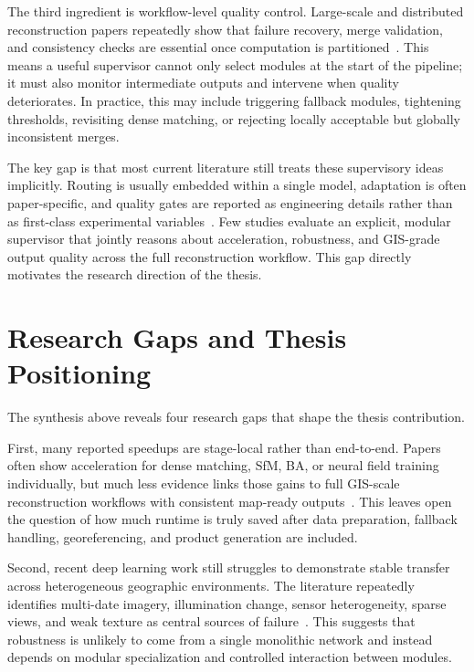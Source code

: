 The third ingredient is workflow-level quality control. Large-scale and distributed reconstruction papers repeatedly show that failure recovery, merge validation, and consistency checks are essential once computation is partitioned~\cite{Zheng2023,Li2025BALM,Zhou2026,Elias2025}. This means a useful supervisor cannot only select modules at the start of the pipeline; it must also monitor intermediate outputs and intervene when quality deteriorates. In practice, this may include triggering fallback modules, tightening thresholds, revisiting dense matching, or rejecting locally acceptable but globally inconsistent merges.

The key gap is that most current literature still treats these supervisory ideas implicitly. Routing is usually embedded within a single model, adaptation is often paper-specific, and quality gates are reported as engineering details rather than as first-class experimental variables~\cite{SMoEStereo2025,SatDN2025,Elias2025}. Few studies evaluate an explicit, modular supervisor that jointly reasons about acceleration, robustness, and GIS-grade output quality across the full reconstruction workflow. This gap directly motivates the research direction of the thesis.

\section{Research Gaps and Thesis Positioning}

The synthesis above reveals four research gaps that shape the thesis contribution.

First, many reported speedups are stage-local rather than end-to-end. Papers often show acceleration for dense matching, SfM, BA, or neural field training individually, but much less evidence links those gains to full GIS-scale reconstruction workflows with consistent map-ready outputs~\cite{Li2025FastMap,SatDN2025,Elias2025}. This leaves open the question of how much runtime is truly saved after data preparation, fallback handling, georeferencing, and product generation are included.

Second, recent deep learning work still struggles to demonstrate stable transfer across heterogeneous geographic environments. The literature repeatedly identifies multi-date imagery, illumination change, sensor heterogeneity, sparse views, and weak texture as central sources of failure~\cite{Masquil2026,SatDepth2025,SEO2025,ShadowGS2026}. This suggests that robustness is unlikely to come from a single monolithic network and instead depends on modular specialization and controlled interaction between modules.

